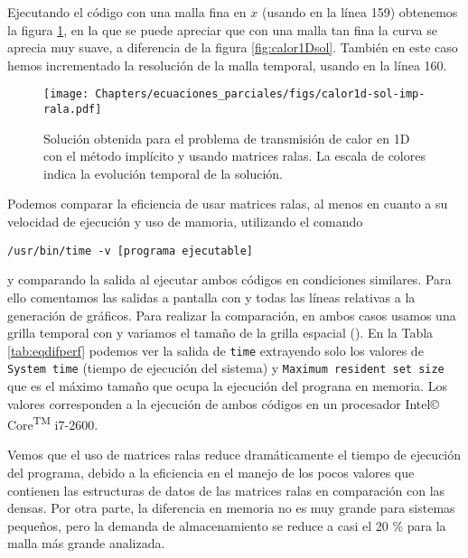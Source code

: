 Ejecutando el código con una malla fina en $x$ (usando  en la línea 159) obtenemos la figura \ref{fig:calor1Dsol-imp-rala}, en la que se puede apreciar que con una malla tan fina la curva se aprecia muy suave, a diferencia de la figura \ref{fig:calor1Dsol}. También en este caso hemos incrementado la resolución de la malla temporal, usando  en la línea 160.

\begin{figure}[ht]
 \centering
 \texttt{[image: Chapters/ecuaciones\_parciales/figs/calor1d-sol-imp-rala.pdf]}
 \caption{Solución obtenida para el problema de transmisión de calor en 1D con el método implícito y usando matrices ralas. La escala de colores indica la evolución temporal de la solución.}
 \label{fig:calor1Dsol-imp-rala}
\end{figure}


Podemos comparar la eficiencia de usar matrices ralas, al menos en cuanto a su velocidad de ejecución y uso de mamoria, utilizando el comando 
\begin{verbatim}
/usr/bin/time -v [programa ejecutable]
\end{verbatim}
y comparando la salida al ejecutar ambos códigos en condiciones similares. Para ello comentamos las salidas a pantalla con  y todas las líneas relativas a la generación de gráficos. Para realizar la comparación, en ambos casos usamos una grilla temporal con  y variamos el tamaño de la grilla espacial (). En la Tabla \ref{tab:eqdifperf} podemos ver la salida de \verb|time| extrayendo solo los valores de \verb|System time| (tiempo de ejecución del sistema) y \verb|Maximum resident set size| que es el máximo tamaño que ocupa la ejecución del prograna en memoria. Los valores corresponden a la ejecución de ambos códigos en un procesador Intel© Core\textsuperscript{TM} i7-2600. 

Vemos que el uso de matrices ralas reduce dramáticamente el tiempo de ejecución del programa, debido a la eficiencia en el manejo de los pocos valores que contienen las estructuras de datos de las matrices ralas en comparación con las densas. Por otra parte, la diferencia en memoria no es muy grande para sistemas pequeños, pero la demanda de almacenamiento se reduce a casi el 20 \% para la malla más grande analizada. 

